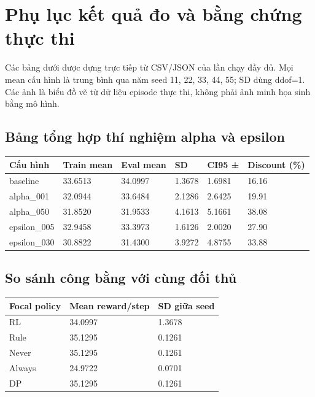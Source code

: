 \section{Phụ lục kết quả đo và bằng chứng thực
thi}\label{phux1ee5-lux1ee5c-kux1ebft-quux1ea3-ux111o-vuxe0-bux1eb1ng-chux1ee9ng-thux1ef1c-thi}

Các bảng dưới được dựng trực tiếp từ CSV/JSON của lần chạy đầy đủ. Mọi
mean cấu hình là trung bình qua năm seed 11, 22, 33, 44, 55; SD dùng
ddof=1. Các ảnh là biểu đồ vẽ từ dữ liệu episode thực thi, không phải
ảnh minh họa sinh bằng mô hình.

\subsection{Bảng tổng hợp thí nghiệm alpha và
epsilon}\label{bux1ea3ng-tux1ed5ng-hux1ee3p-thuxed-nghiux1ec7m-alpha-vuxe0-epsilon}

{\def\LTcaptype{none} %
\begin{longtable}[]{@{}llllll@{}}
\toprule\noalign{}
Cấu hình & Train mean & Eval mean & SD & CI95 ± & Discount (\%) \\
\midrule\noalign{}
\endhead
\bottomrule\noalign{}
\endlastfoot
baseline & 33.6513 & 34.0997 & 1.3678 & 1.6981 & 16.16 \\
alpha\_001 & 32.0944 & 33.6484 & 2.1286 & 2.6425 & 19.91 \\
alpha\_050 & 31.8520 & 31.9533 & 4.1613 & 5.1661 & 38.08 \\
epsilon\_005 & 32.9458 & 33.3973 & 1.6126 & 2.0020 & 27.90 \\
epsilon\_030 & 30.8822 & 31.4300 & 3.9272 & 4.8755 & 33.88 \\
\end{longtable}
}

\subsection{So sánh công bằng với cùng đối
thủ}\label{so-suxe1nh-cuxf4ng-bux1eb1ng-vux1edbi-cuxf9ng-ux111ux1ed1i-thux1ee7}

{\def\LTcaptype{none} %
\begin{longtable}[]{@{}lll@{}}
\toprule\noalign{}
Focal policy & Mean reward/step & SD giữa seed \\
\midrule\noalign{}
\endhead
\bottomrule\noalign{}
\endlastfoot
RL & 34.0997 & 1.3678 \\
Rule & 35.1295 & 0.1261 \\
Never & 35.1295 & 0.1261 \\
Always & 24.9722 & 0.0701 \\
DP & 35.1295 & 0.1261 \\
\end{longtable}
}

